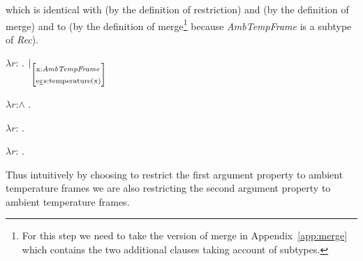 which is identical with  (by the definition of restriction)
and  (by the definition of merge) and to 
 (by the definition of merge\footnote{For this step we need
  to take the version of merge in Appendix~\ref{app:merge} which
  contains the two additional clauses taking account of subtypes.} because \textit{AmbTempFrame} is a subtype of \textit{Rec}).
\begin{ex} 
\begin{subex} 
 
\item $\lambda r$: . 
            $|_\text{\smallrecord{\smalltfield{x}{\textit{AmbTempFrame}}\\
        \smallrfield{e}{$s$}{temperature(x)}}}$ 
 
\item $\lambda r$:\d{$\wedge$} . 

\item $\lambda
  r$: . 

\item $\lambda r$: . 
 
\end{subex} 
\label{ex:riserestrambtemp}  
\end{ex} 
Thus intuitively by choosing to restrict the first argument property
to ambient temperature frames we are also restricting the second
argument property to ambient temperature frames. 

